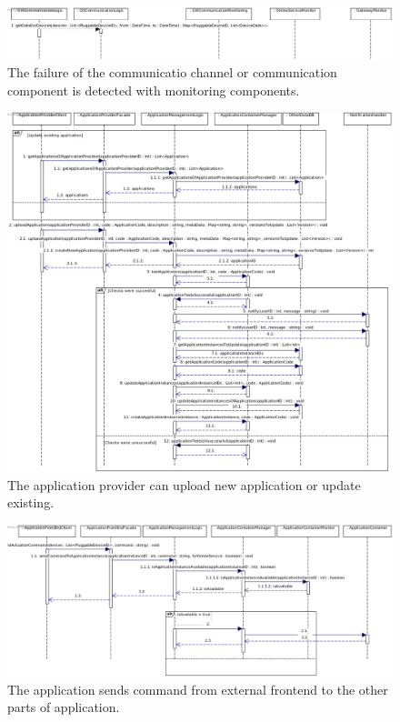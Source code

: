     \begin{figure}[!htp]
    	\centering
    	\includegraphics[width=\textwidth]{images/sequence-Av1-UC15}
    	\caption[Detection and handling of communication channel failure]{ The failure of the communicatio channel or communication component is detected with 
    	monitoring components.}\label{fig:seq_scenario7}
    \end{figure}

    \begin{figure}[h]
    	\centering
    	\includegraphics[width=\textwidth]{images/sequence-U1-UC22}
    	\caption[Upgrading an application]{ The application provider can upload new application or update existing.}\label{fig:seq_scenario8}
    \end{figure}

    \begin{figure}[!htp]
    	\centering
    	\includegraphics[width=\textwidth]{images/sequence-UC12-UC26-UC27}
    	\caption[Sending actuation commands via a mobile app]{ The application sends command from external frontend to the other parts of application. }\label{fig:seq_scenario9}
    \end{figure}
